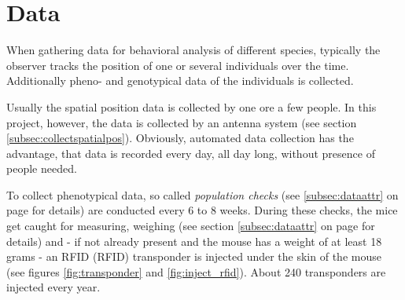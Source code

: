 \newpage
\section{Data}
\label{sec:datacollection}

When gathering data for behavioral analysis of different species, typically the observer tracks the position of one or several individuals over the time. Additionally pheno- and genotypical data of the individuals is collected.

Usually the spatial position data is collected by one ore a few people. In this project, however, the data is collected by an antenna system (see section \ref{subsec:collectspatialpos}). Obviously, automated data collection has the advantage, that data is recorded every day, all day long, without presence of people needed.

To collect phenotypical data, so called \textit{population checks} (see \ref{subsec:dataattr} on page \pageref{subsec:dataattr} for details) are conducted every 6 to 8 weeks. During these checks, the mice get caught for measuring, weighing (see section \ref{subsec:dataattr} on page \pageref{subsec:dataattr} for details) and - if not already present and the mouse has a weight of at least 18 grams - an \ac{RFID} (RFID) transponder is injected under the skin of the mouse (see figures \ref{fig:transponder} and \ref{fig:inject_rfid}). About 240 transponders are injected every year.

